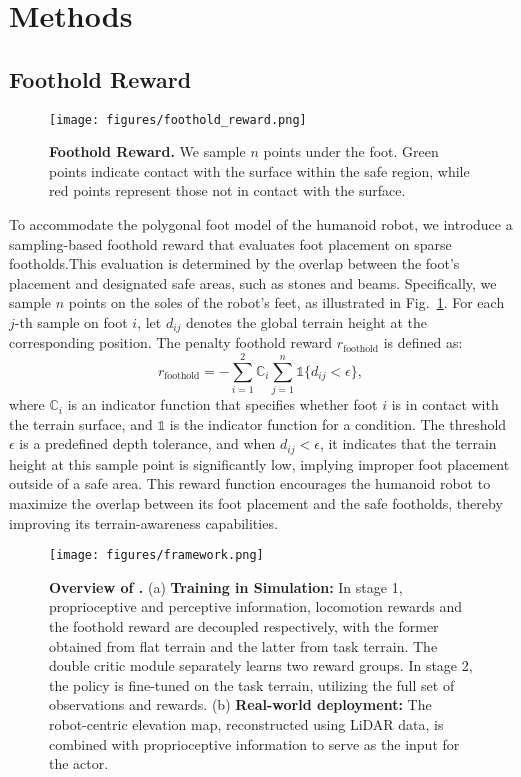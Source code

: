 \section{Methods}

\subsection{Foothold Reward}
\label{sec:method_footholdreward}

\begin{figure}[t]
    \centering
    \texttt{[image: figures/foothold\_reward.png]}
    \caption{\textbf{Foothold Reward.} We sample $n$ points under the foot. Green points indicate contact with the surface within the safe region, while red points represent those not in contact with the surface.}
    \label{fig:foothold_reward}
\end{figure}

To accommodate the polygonal foot model of the humanoid robot, we introduce a sampling-based foothold reward that evaluates foot placement on sparse footholds.This evaluation is determined by the overlap between the foot's placement and designated safe areas, such as stones and beams. Specifically, we sample $n$ points on the soles of the robot’s feet, as illustrated in Fig.~\ref{fig:foothold_reward}. For each $j$-th sample on foot $i$, let $d_{ij}$ denotes the global terrain height at the corresponding position. The penalty foothold reward $r_\text{foothold}$ is defined as:
\begin{equation}
    r_\text{foothold} = -\sum_{i=1}^2 \mathbb{C}_i \sum_{j=1}^n \mathds{1} \{ d_{ij} < \epsilon \},
\end{equation}
where $\mathbb{C}_i$ is an indicator function that specifies whether foot $i$ is in contact with the terrain surface, and $\mathds{1}$ is the indicator function for a condition. The threshold $\epsilon$ is a predefined depth tolerance, and when $d_{ij} < \epsilon$, it indicates that the terrain height at this sample point is significantly low, implying improper foot placement outside of a safe area. This reward function encourages the humanoid robot to maximize the overlap between its foot placement and the safe footholds, thereby improving its terrain-awareness capabilities.

\begin{figure*}[t]
    \centering
    \texttt{[image: figures/framework.png]}
    \caption{\textbf{Overview of \beamdojo.} (a) \textbf{Training in Simulation:} In stage 1, proprioceptive and perceptive information, locomotion rewards and the foothold reward are decoupled respectively, with the former obtained from flat terrain and the latter from task terrain. The double critic module separately learns two reward groups. In stage 2, the policy is fine-tuned on the task terrain, utilizing the full set of observations and rewards. (b) \textbf{Real-world deployment:} The robot-centric elevation map, reconstructed using LiDAR data, is combined with proprioceptive information to serve as the input for the actor.}
    \label{fig:framework}
\end{figure*}

